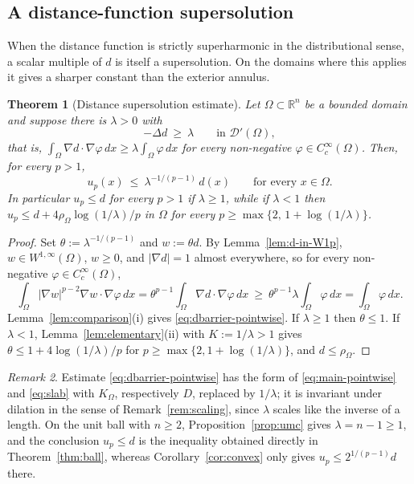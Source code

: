 \documentclass[11pt]{article}
\newcommand{\R}{\mathbb R}
\newcommand{\abs}[1]{\lvert #1\rvert}
\newtheorem{theorem}{Theorem}[section]
\theoremstyle{definition}
\theoremstyle{remark}
\newtheorem{remark}[theorem]{Remark}
\begin{document}
\subsection{A distance-function supersolution}\label{subsec:dbarrier}
When the distance function is strictly superharmonic in the distributional
sense, a scalar multiple of $d$ is itself a supersolution. On the domains
where this applies it gives a sharper constant than the exterior annulus.
\begin{theorem}[Distance supersolution estimate]\label{thm:dbarrier}
Let $\Omega\subset\R^n$ be a bounded domain and suppose there is $\lambda>0$
with
\begin{equation}\label{eq:kappa}
-\Delta d\ \ge\ \lambda
\qquad\text{in }\mathcal D'(\Omega),
\end{equation}
that is,
$\int_\Omega\nabla d\cdot\nabla\varphi\,dx\ge\lambda\int_\Omega\varphi\,dx$ for
every non-negative $\varphi\in C_c^\infty(\Omega)$. Then, for every $p>1$,
\begin{equation}\label{eq:dbarrier-pointwise}
u_p(x)\ \le\ \lambda^{-1/(p-1)}\,d(x)
\qquad\text{for every }x\in\Omega.
\end{equation}
In particular $u_p\le d$ for every $p>1$ if $\lambda\ge1$, while if
$\lambda<1$ then $u_p\le d+4\rho_\Omega\log(1/\lambda)/p$ in $\Omega$ for
every $p\ge\max\{2,\,1+\log(1/\lambda)\}$.
\end{theorem}
\begin{proof}
Set $\theta:=\lambda^{-1/(p-1)}$ and $w:=\theta d$. By
Lemma~\ref{lem:d-in-W1p}, $w\in W^{1,\infty}(\Omega)$, $w\ge0$, and
$\abs{\nabla d}=1$ almost everywhere, so for every non-negative
$\varphi\in C_c^\infty(\Omega)$,
\[
\int_\Omega\abs{\nabla w}^{p-2}\nabla w\cdot\nabla\varphi\,dx
=\theta^{p-1}\int_\Omega\nabla d\cdot\nabla\varphi\,dx
\ \ge\ \theta^{p-1}\lambda\int_\Omega\varphi\,dx
=\int_\Omega\varphi\,dx .
\]
Lemma~\ref{lem:comparison}(i) gives \eqref{eq:dbarrier-pointwise}. If
$\lambda\ge1$ then $\theta\le1$. If $\lambda<1$,
Lemma~\ref{lem:elementary}(ii) with $K:=1/\lambda>1$ gives
$\theta\le1+4\log(1/\lambda)/p$ for $p\ge\max\{2,1+\log(1/\lambda)\}$, and
$d\le\rho_\Omega$.
\end{proof}

\begin{remark}\label{rem:dbarrier-structure}
Estimate \eqref{eq:dbarrier-pointwise} has the form of
\eqref{eq:main-pointwise} and \eqref{eq:slab} with $K_\Omega$, respectively
$D$, replaced by $1/\lambda$; it is invariant under dilation in the sense of
Remark~\ref{rem:scaling}, since $\lambda$ scales like the inverse of a length.
On the unit ball with $n\ge2$, Proposition~\ref{prop:umc} gives
$\lambda=n-1\ge1$, and the conclusion $u_p\le d$ is the inequality obtained
directly in Theorem~\ref{thm:ball}, whereas Corollary~\ref{cor:convex} only
gives $u_p\le 2^{1/(p-1)}d$ there.
\end{remark}
\end{document}

